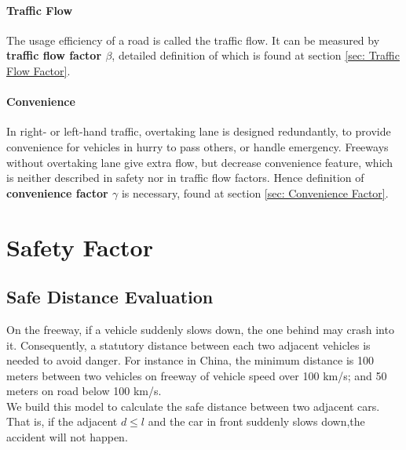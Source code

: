 \paragraph{Traffic Flow} The usage efficiency of a road is 
called the traffic flow. It can be measured by \textbf{traffic 
flow factor $\beta$}, detailed definition of which is found at 
section \ref{sec: Traffic Flow Factor}.

\paragraph{Convenience} In right- or left-hand traffic, 
overtaking lane is designed redundantly, to provide 
convenience for vehicles in hurry to pass others, or handle 
emergency. Freeways without overtaking lane give extra flow, 
but decrease convenience feature, which is neither described 
in safety nor in traffic flow factors. Hence definition of 
\textbf{convenience factor $\gamma$} is necessary, found at  
section \ref{sec: Convenience Factor}.


\section{Safety Factor}
\label{sec: Safety Factor}

\subsection{Safe Distance Evaluation}
\label{sec: Safe Distance Evaluation}

On the freeway, if a vehicle suddenly slows down, the one 
behind may crash into it. Consequently, a statutory 
distance between each two adjacent vehicles is needed to 
avoid danger. For instance in China, the minimum distance 
is 100 meters between two vehicles on freeway of vehicle 
speed over 100 km/s; and 50 meters on road below 100 km/s.
\cite{PRC_State_Council_Decree_405}\\

We build this model 
to calculate the safe distance between two adjacent cars. 
That is, if the adjacent $d \leq l$ and the car in front 
suddenly slows down,the accident will not happen.\\ \\

